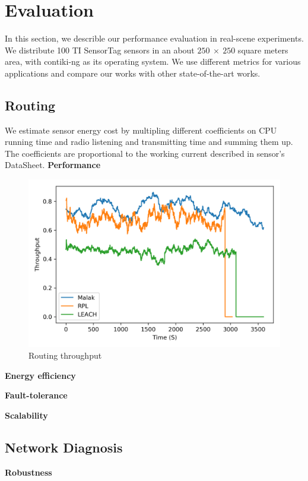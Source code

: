 \section{Evaluation}
\label{Eva}

In this section, we describle our performance evaluation in real-scene
experiments. We distribute 100 TI SensorTag sensors in an about $250~\times~250$
square meters area, with contiki-ng as its operating system. We use different
metrics for various applications and compare our works with other
state-of-the-art works.

\subsection{Routing}
We estimate sensor energy cost by multipling different coefficients on CPU
running time and radio listening and transmitting time and summing them up. The
coefficients are proportional to the working current described in sensor's
DataSheet.
\textbf{Performance}
\begin{figure}[htbp]
	\centering
	\includegraphics[width=.85\columnwidth]{Figure/throughput}
	\vspace{-0.1in}
	\caption{Routing throughput}
	\label{throughtput}
	\vspace{-0.2in}
\end{figure}
\textbf{Energy efficiency}



\textbf{Fault-tolerance}

\textbf{Scalability}

\subsection{Network Diagnosis}
\textbf{Robustness}

